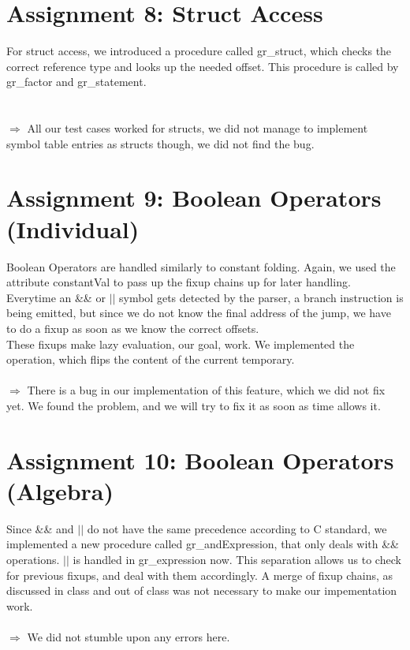 \documentclass[a4paper,12pt]{article}
\begin{document}
\section{Assignment 8: Struct Access}
For struct access, we introduced a procedure called gr\_struct, which checks the correct reference type and looks up the needed offset. This procedure is called by gr\_factor and gr\_statement. \\
\\\\
$\Rightarrow$ All our test cases worked for structs, we did not manage to implement symbol table entries as structs though, we did not find the bug. 

\section{Assignment 9: Boolean Operators (Individual)}
Boolean Operators are handled similarly to constant folding. Again, we used the attribute constantVal to pass up the fixup chains up for later handling. Everytime an \&\& or $||$ symbol gets detected by the parser, a branch instruction is being emitted, but since we do not know the final address of the jump, we have to do a fixup as soon as we know the correct offsets.\\These fixups make lazy evaluation, our goal, work. We implemented the \! operation, which flips the content of the current temporary. \\\\
$\Rightarrow$ There is a bug in our implementation of this feature, which we did not fix yet. We found the problem, and we will try to fix it as soon as time allows it. 

\section{Assignment 10: Boolean Operators (Algebra)}
Since \&\& and $||$ do not have the same precedence according to C standard\cite{cs50}, we implemented a new procedure called gr\_andExpression, that only deals with \&\& operations. $||$ is handled in gr\_expression now. This separation allows us to check for previous fixups, and deal with them accordingly. A merge of fixup chains, as discussed in class and out of class was not necessary to make our impementation work. \\\\
$\Rightarrow$ We did not stumble upon any errors here. 
\end{document}
